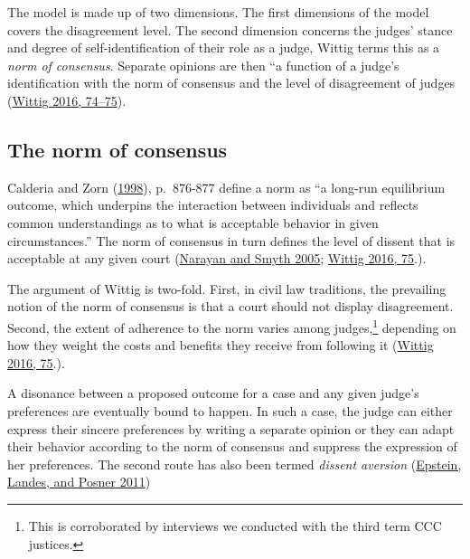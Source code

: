 \documentclass[
  11pt,
]{article}
\begin{document}
The model is made up of two dimensions. The first dimensions of the
model covers the disagreement level. The second dimension concerns the
judges' stance and degree of self-identification of their role as a
judge, Wittig terms this as a \emph{norm of consensus}. Separate
opinions are then ``a function of a judge's identification with the norm
of consensus and the level of disagreement of judges
(\protect\hyperlink{ref-wittigOccurrenceSeparateOpinions2016}{Wittig
2016, 74--75}).

\hypertarget{the-norm-of-consensus}{%
\subsection{The norm of consensus}\label{the-norm-of-consensus}}

Calderia and Zorn
(\protect\hyperlink{ref-calderiaTimeConsensualNorms1998}{1998}),
p.~876-877 define a norm as ``a long-run equilibrium outcome, which
underpins the interaction between individuals and reflects common
understandings as to what is acceptable behavior in given
circumstances.'' The norm of consensus in turn defines the level of
dissent that is acceptable at any given court
(\protect\hyperlink{ref-narayanConsensualNormHigh2005}{Narayan and Smyth
2005};
\protect\hyperlink{ref-wittigOccurrenceSeparateOpinions2016}{Wittig
2016, 75}.).

The argument of Wittig is two-fold. First, in civil law traditions, the
prevailing notion of the norm of consensus is that a court should not
display disagreement. Second, the extent of adherence to the norm varies
among judges,\footnote{This is corroborated by interviews we conducted
  with the third term CCC justices.} depending on how they weight the
costs and benefits they receive from following it
(\protect\hyperlink{ref-wittigOccurrenceSeparateOpinions2016}{Wittig
2016, 75}.).

A disonance between a proposed outcome for a case and any given judge's
preferences are eventually bound to happen. In such a case, the judge
can either express their sincere preferences by writing a separate
opinion or they can adapt their behavior according to the norm of
consensus and suppress the expression of her preferences. The second
route has also been termed \emph{dissent aversion}
(\protect\hyperlink{ref-epsteinWhyWhenJudges2011}{Epstein, Landes, and
Posner 2011})
\end{document}
